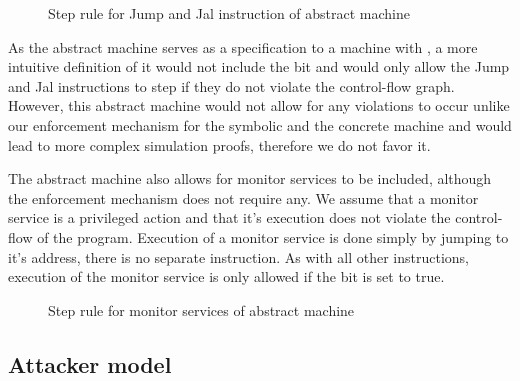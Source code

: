 \begin{figure}[!htpb]
\bigskip

\caption{Step rule for Jump and Jal instruction of abstract machine}
\end{figure}

As the abstract machine serves as a specification to a machine with
\CFI, a more intuitive definition of it would not include the \ok bit
and would only allow the Jump and Jal instructions to step if they do
not violate the control-flow graph. However, this abstract machine
would not allow for any violations to occur unlike our enforcement
mechanism for the symbolic and the concrete machine and would lead to
more complex simulation proofs, therefore we do not favor it.

The abstract machine also allows for monitor services to be included,
although the \CFI enforcement mechanism does not require any. We
assume that a monitor service is a privileged action and that it's
execution does not violate the control-flow of the program. Execution
of a monitor service is done simply by jumping to it's address, there
is no separate instruction. As with all other instructions, execution
of the monitor service is only allowed if the \ok bit is set to true.

\begin{figure}[htb!]
\caption{Step rule for monitor services of abstract machine}
\end{figure}


\subsection{Attacker model}\label{sec:abstract_attacker}

